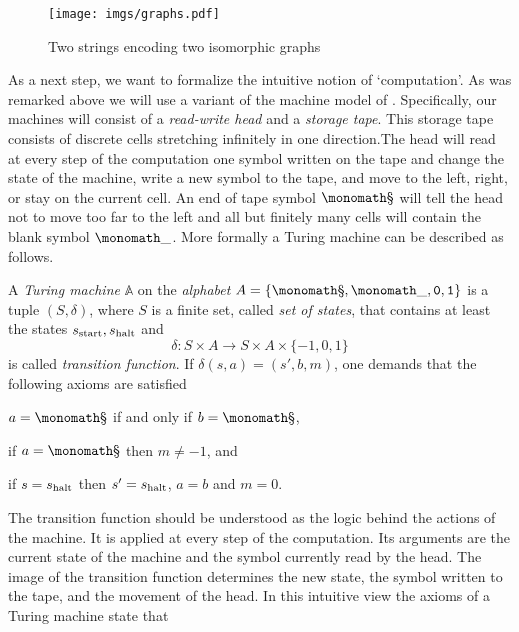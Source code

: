 \begin{center}
  \begin{figure}
    \texttt{[image: imgs/graphs.pdf]}
    \caption{Two strings encoding two isomorphic graphs}
    \label{fig:encoding of graphs}
  \end{figure}
\end{center}

As a next step, we want to formalize the intuitive notion of ‘computation’. As
was remarked above we will use a variant of the machine model of
\textcite{Turing1936}. Specifically, our machines will consist of a
\emph{read-write head} and a \emph{storage tape}. This storage tape consists of
discrete cells stretching infinitely in one direction.The head will read at
every step of the computation one symbol written on the tape and change the
state of the machine, write a new symbol to the tape, and move to the left,
right, or stay on the current cell. An end of tape symbol \(\sta\) will tell the
head not to move too far to the left and all but finitely many cells will
contain the blank symbol \(\emp\). More formally a Turing machine can be
described as follows.

\begin{defin}
  A \emph{Turing machine} $\mathbb A$ on the \emph{alphabet} $A = \lbrace \sta,
  \emp, \zer, \one \rbrace$ is a tuple $(S, δ)$, where $S$ is a finite set,
  called \emph{set of states}, that contains at least the states \(s_{\text{start}},
  s_{\text{halt}}\) and
  \[
    δ: S × A → S × A × \lbrace -1, 0, 1 \rbrace
  \]
  is called \emph{transition function}. If $δ(s, a) = (s', b, m)$, one
  demands that the following axioms are satisfied

  \begin{thmlist}
  \item
    $a = \sta$ if and only if $b = \sta$,
  \item
    if $a = \sta$ then $m ≠ -1$, and
  \item
    if $s = s_{\text{halt}}$ then $s' = s_{\text{halt}}$, $a = b$ and $m = 0$.
  \end{thmlist}
\end{defin}

The transition function should be understood as the logic behind the actions of
the machine. It is applied at every step of the computation. Its arguments are
the current state of the machine and the symbol currently read by the head. The
image of the transition function determines the new state, the symbol written to
the tape, and the movement of the head. In this intuitive view the axioms of a
Turing machine state that


